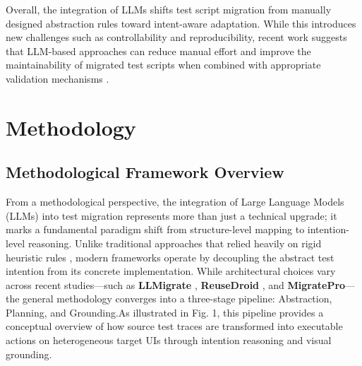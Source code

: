 \documentclass[acmsmall,nonacm]{acmart}
\begin{document}
Overall, the integration of LLMs shifts test script migration from manually designed abstraction rules toward intent-aware adaptation. While this introduces new challenges such as controllability and reproducibility, recent work suggests that LLM-based approaches can reduce manual effort and improve the maintainability of migrated test scripts when combined with appropriate validation mechanisms \cite{zhang2024surveylargelanguagemodels}.



\section{Methodology}

\subsection{Methodological Framework Overview}
From a methodological perspective, the integration of Large Language Models (LLMs) into test migration represents more than just a technical upgrade; it marks a fundamental paradigm shift from structure-level mapping to intention-level reasoning. Unlike traditional approaches that relied heavily on rigid heuristic rules \cite{8952228}, modern frameworks operate by decoupling the abstract test intention from its concrete implementation. While architectural choices vary across recent studies—such as \textbf{LLMigrate} \cite{10.1145/3728975}, \textbf{ReuseDroid} \cite{li2025reusedroidvlmempoweredandroidui}, and \textbf{MigratePro}—the general methodology converges into a three-stage pipeline: Abstraction, Planning, and Grounding.As illustrated in Fig. 1, this pipeline provides a conceptual overview of how source test traces are transformed into executable actions on heterogeneous target UIs through intention reasoning and visual grounding.
\end{document}
